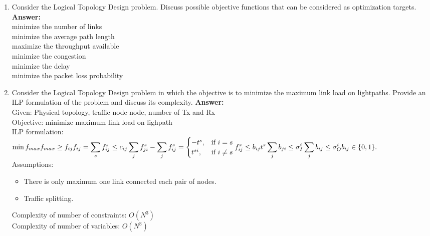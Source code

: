 \documentclass[a4paper]{article}
\begin{document}
\begin{enumerate}
\item Consider the Logical Topology Design problem. Discuss possible objective functions that can be considered as optimization targets.\\
\textbf{Answer:}\\
minimize the number of links \\
minimize the average path length\\
maximize the throughput available\\
minimize the congestion\\
minimize the delay\\
minimize the packet loss probability
\item Consider the Logical Topology Design problem in which the objective is to minimize the maximum link load on lightpaths. Provide an ILP formulation of the problem and discuss its complexity.
\textbf{Answer:}\\
Given: Physical topology, traffic node-node, number of Tx and Rx\\
Objective: minimize maximum link load on lighpath\\
ILP formulation:\\
\begin{math}
\min f_{max} \\
f_{max} \ge f_{ij} \\
f_{ij} = \displaystyle\sum\limits_{s} {f_{ij}^{s}} \le c_{ij} \\
\displaystyle\sum\limits_{j} {f_{ji}^{s}} - \displaystyle\sum\limits_{j} {f_{ij}^{s}} =
  \begin{cases}
  -t^{s}, &\text{if $i = s$}\\
  t^{si}, &\text{if $i \neq s$}
  \end{cases} \\
f_{ij}^{s} \le b_{ij}t^{s}\\
\displaystyle\sum\limits_{j} {b_{ji}} \le \sigma_{I}^{i} \\
\displaystyle\sum\limits_{j} {b_{ij}} \le \sigma_{O}^{i} \\
b_{ij} \in \{0,1\}.
\end{math}\\
Assumptions:
\begin{itemize}
	\item There is only maximum one link connected each pair of nodes.
	\item Traffic splitting.
\end{itemize}
Complexity of number of constraints: $O(N^3)$ \\
Complexity of number of variables: $O(N^3)$ 


\end{enumerate}
\end{document}

